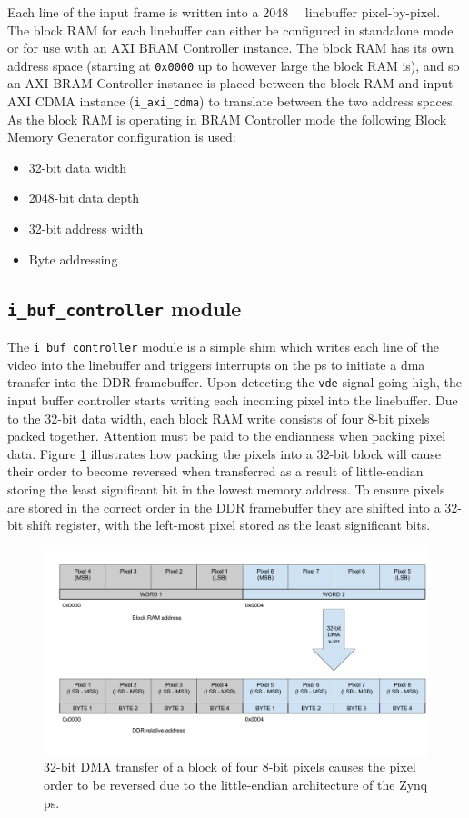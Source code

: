 Each line of the input frame is written into a \SI{2048}{\kilo\bit} linebuffer pixel-by-pixel. The block RAM for each linebuffer can either be configured in standalone mode or for use with an AXI BRAM Controller instance. The block RAM has its own address space (starting at \texttt{0x0000} up to however large the block RAM is), and so an AXI BRAM Controller instance is placed between the block RAM and input AXI CDMA instance (\texttt{i\_axi\_cdma}) to translate between the two address spaces. As the block RAM is operating in BRAM Controller mode the following Block Memory Generator configuration is used:
\begin{itemize}
  \item 32-bit data width
  \item 2048-bit data depth
  \item 32-bit address width
  \item Byte addressing
\end{itemize}

\subsection{\texttt{i\_buf\_controller} module}
The \texttt{i\_buf\_controller} module is a simple shim which writes each line of the video into the linebuffer and triggers interrupts on the \gls{ps} to initiate a \gls{dma} transfer into the DDR framebuffer. Upon detecting the \texttt{vde} signal going high, the input buffer controller starts writing each incoming pixel into the linebuffer. Due to the 32-bit data width, each block RAM write consists of four 8-bit pixels packed together. Attention must be paid to the endianness when packing pixel data. Figure \ref{fig:dma_endianness} illustrates how packing the pixels into a 32-bit block will cause their order to become reversed when transferred as a result of little-endian storing the least significant bit in the lowest memory address. To ensure pixels are stored in the correct order in the DDR framebuffer they are shifted into a 32-bit shift register, with the left-most pixel stored as the least significant bits.

\begin{figure}
  \centering
  \includegraphics[width=1\textwidth]{./img/dma_endianness.png}
  \caption{32-bit DMA transfer of a block of four 8-bit pixels causes the pixel order to be reversed due to the little-endian architecture of the Zynq \gls{ps}.}
  \label{fig:dma_endianness}
\end{figure}

